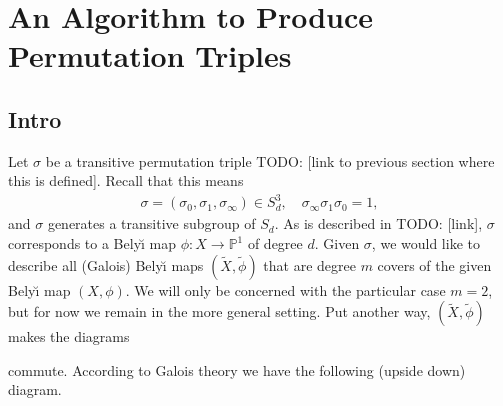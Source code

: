 \documentclass[oneside, reqno, 12pt]{amsart}
\theoremstyle{definition}
\theoremstyle{remark}
\newcommand{\PP}{\mathbb P}
\DeclareMathOperator{\Gal}{Gal}
\newcommand{\todo}[1]{{\color{red} \sf TODO: [#1]}}
\newcommand{\Belyi}{Bely\u{\i} }
\begin{document}
\section{An Algorithm to Produce Permutation Triples}{
  \subsection{Intro}{
    Let $\sigma$ be a transitive permutation triple \todo{link to previous section where this is defined}.
    Recall that this means
    \begin{align*}
      \sigma = \left(\sigma_0, \sigma_1, \sigma_\infty\right)\in S_d^3,
      \quad
      \sigma_\infty\sigma_1\sigma_0 = 1,
    \end{align*}
    and $\sigma$ generates a transitive subgroup of $S_d$.
    As is described in \todo{link},
    $\sigma$ corresponds to a \Belyi map $\phi: X\to\PP^1$ of degree $d$.
    Given $\sigma$,
    we would like to describe all (Galois) \Belyi maps
    $(\widetilde{X},\widetilde{\phi})$ that are degree $m$ covers
    of the given \Belyi map $(X,\phi)$.
    We will only be concerned with the particular case $m=2$,
    but for now we remain in the more general setting.
    Put another way, $(\widetilde{X},\widetilde{\phi})$ makes the diagrams
    \begin{center}
      \quad
      \quad
      \quad
    \end{center}
    commute.
    According to Galois theory we have the following
    (upside down)
    diagram.
    \begin{center}

\end{center}}}
\end{document}
